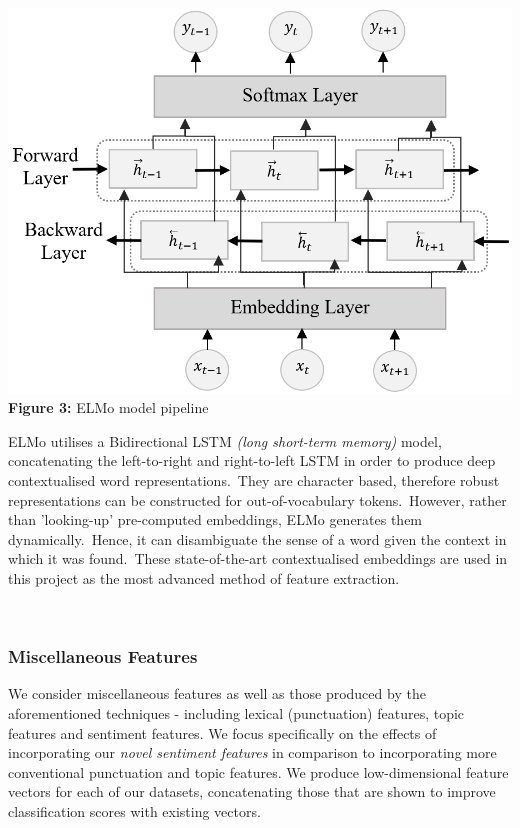 \documentclass[12pt,a4paper]{article}
\begin{document}
\begin{minipage}{0.38\textwidth}
	 	\begin{center}
		\hspace{-1.5cm}\includegraphics[width=1.2\textwidth]{Images/elmo_diagram2.png}\\
		\hspace{-1cm}\textbf{Figure 3:} ELMo model pipeline\\
		\label{ELMo Model}
	\end{center}
\end{minipage} \hfill
\begin{minipage}{0.58\textwidth}
	  ELMo utilises a Bidirectional LSTM \textit{(long short-term memory)} model, concatenating the left-to-right and right-to-left LSTM in order to produce deep contextualised word representations.\ They are character based, therefore robust representations can be constructed for out-of-vocabulary tokens.\ However, rather than 'looking-up' pre-computed embeddings, ELMo generates them dynamically.\ Hence, it can disambiguate the sense of a word given the context in which it was found.\ These state-of-the-art contextualised embeddings are used in this project as the most advanced method of feature extraction.
\end{minipage}\\

\subsubsection{Miscellaneous Features}
We consider miscellaneous features as well as those produced by the aforementioned techniques - including lexical (punctuation) features, topic features and sentiment features. We focus specifically on the effects of incorporating our \textit{novel sentiment features} in comparison to incorporating more conventional punctuation and topic features. We produce low-dimensional feature vectors for each of our datasets, concatenating those that are shown to improve classification scores with existing vectors.\\\vspace{-5pt}
\end{document}
